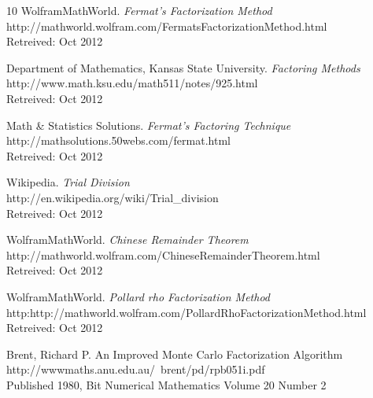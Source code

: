 \documentclass[a4paper, 12pt]{report}
\begin{document}
\begin{thebibliography} {10}
	WolframMathWorld.
	\emph{Fermat's Factorization Method} \\
	http://mathworld.wolfram.com/FermatsFactorizationMethod.html \\
	Retreived: Oct 2012
	
	Department of Mathematics, Kansas State University.
	\emph{Factoring Methods} \\
	http://www.math.ksu.edu/math511/notes/925.html \\
	Retreived: Oct 2012
	
	Math \& Statistics Solutions.
	\emph{Fermat's Factoring Technique} \\
	http://mathsolutions.50webs.com/fermat.html \\
	Retreived: Oct 2012

	Wikipedia.
	\emph{Trial Division} \\
	http://en.wikipedia.org/wiki/Trial\_division \\
	Retreived: Oct 2012

	WolframMathWorld.
	\emph{Chinese Remainder Theorem} \\
	http://mathworld.wolfram.com/ChineseRemainderTheorem.html \\
	Retreived: Oct 2012

	WolframMathWorld.
	\emph{Pollard rho Factorization Method} \\
	http:http://mathworld.wolfram.com/PollardRhoFactorizationMethod.html \\
	Retreived: Oct 2012

	Brent, Richard P. An Improved Monte Carlo Factorization Algorithm \\
	http://wwwmaths.anu.edu.au/~brent/pd/rpb051i.pdf \\
	Published 1980, Bit Numerical Mathematics Volume 20 Number 2

\end{thebibliography}
\end{document}
